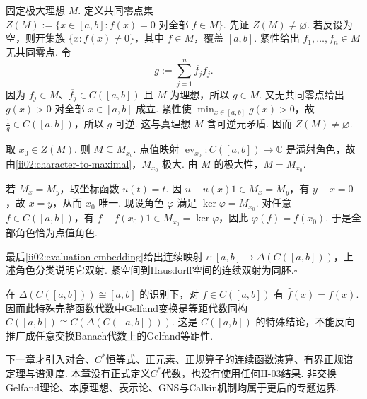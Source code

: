 \begin{FAProof}
固定极大理想 \(\displaystyle M\). 定义共同零点集
\(\displaystyle Z(M) := \{x\in[a,b]:f(x)=0\text{ 对全部 }f\in M\}.\)
先证 \(\displaystyle Z(M)\neq\varnothing\). 若反设为空，则开集族 \(\displaystyle\{x:f(x)\neq0\}\)，其中 \(\displaystyle f\in M\)，覆盖 \(\displaystyle[a,b]\). 紧性给出 \(\displaystyle f_1,\dots,f_n\in M\) 无共同零点. 令
\[
g
:=
\sum_{j=1}^{n}\overline{f_j}f_j.
\]
因为 \(\displaystyle f_j\in M\)、\(\displaystyle\overline{f_j}\in C([a,b])\) 且 \(\displaystyle M\) 为理想，所以 \(\displaystyle g\in M\). 又无共同零点给出 \(\displaystyle g(x)>0\) 对全部 \(\displaystyle x\in[a,b]\) 成立. 紧性使 \(\displaystyle\min_{x\in[a,b]}g(x)>0\)，故 \(\displaystyle\frac{1}{g}\in C([a,b])\)，所以 \(\displaystyle g\) 可逆. 这与真理想 \(\displaystyle M\) 含可逆元矛盾. 因而 \(\displaystyle Z(M)\neq\varnothing\).

取 \(\displaystyle x_0\in Z(M)\). 则 \(\displaystyle M\subseteq M_{x_0}\). 点值映射 \(\displaystyle\operatorname{ev}_{x_0}:C([a,b])\to\mathbb C\) 是满射角色，故由\autoref{ii02:character-to-maximal}，\(\displaystyle M_{x_0}\) 极大. 由 \(\displaystyle M\) 的极大性，\(\displaystyle M=M_{x_0}\).

若 \(\displaystyle M_x=M_y\)，取坐标函数 \(\displaystyle u(t)=t\). 因 \(\displaystyle u-u(x)1\in M_x=M_y\)，有 \(\displaystyle y-x=0\)，故 \(\displaystyle x=y\)，从而 \(\displaystyle x_0\) 唯一. 现设角色 \(\displaystyle\varphi\) 满足 \(\displaystyle\ker\varphi=M_{x_0}\). 对任意 \(\displaystyle f\in C([a,b])\)，有 \(\displaystyle f-f(x_0)1\in M_{x_0}=\ker\varphi\)，因此 \(\displaystyle\varphi(f)=f(x_0)\). 于是全部角色恰为点值角色.

最后\autoref{ii02:evaluation-embedding}给出连续映射 \(\displaystyle\iota:[a,b]\to\Delta(C([a,b]))\)，上述角色分类说明它双射. 紧空间到Hausdorff空间的连续双射为同胚.\hfill\(\square\)
\end{FAProof}

在 \(\displaystyle\Delta(C([a,b]))\cong[a,b]\) 的识别下，对 \(\displaystyle f\in C([a,b])\) 有 \(\displaystyle\widehat f(x)=f(x)\). 因而此特殊完整函数代数中Gelfand变换是等距代数同构
\(\displaystyle C([a,b]) \cong C(\Delta(C([a,b]))).\)
这是 \(\displaystyle C([a,b])\) 的特殊结论，不能反向推广成任意交换Banach代数上的Gelfand等距性.

\begin{FARemark}[II-03边界]
下一章才引入对合、\(\displaystyle C^*\)恒等式、正元素、正规算子的连续函数演算、有界正规谱定理与谱测度. 本章没有正式定义\(\displaystyle C^*\)代数，也没有使用任何II-03结果. 非交换Gelfand理论、本原理想、表示论、GNS与Calkin机制均属于更后的专题边界.
\end{FARemark}

